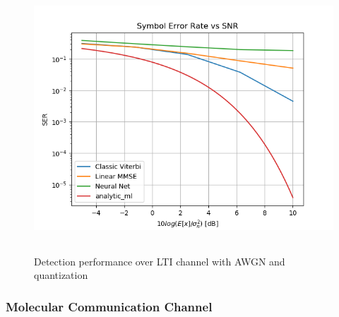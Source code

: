 \documentclass[12pt,a4paper]{article}
\begin{document}
\begin{figure}[H]
	\includegraphics[width=\textwidth,height = 10cm]{results/lti_normal}
		  \caption{Detection performance over LTI channel with AWGN and quantization}
	  \label{fig:Quantized performance}
\end{figure}


\subsubsection{Molecular Communication Channel}
\end{document}
